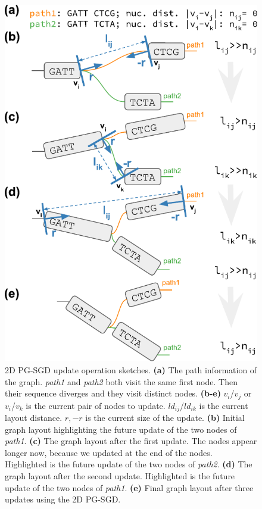 \begin{figure}[!htb]
	\centering
		\includegraphics[width=0.8\linewidth, trim=0cm 0cm 0cm 0cm, clip]{fig/sketches/FigureToHeaven.pdf}
	\caption{
		2D PG-SGD update operation sketches. \textbf{(a)} The path information of the graph. \textit{path1} and \textit{path2} both visit the same first node. Then their sequence diverges and they visit distinct nodes. \textbf{(b-e)} $v_i$/$v_j$ or $v_i$/$v_k$ is the current pair of nodes to update. $ld_{ij}$/$ld_{ik}$ is the current layout distance. $r,-r$ is the current size of the update. \textbf{(b)} Initial graph layout highlighting the future update of the two nodes of \textit{path1}. \textbf{(c)} The graph layout after the first update. The nodes appear longer now, because we updated at the end of the nodes. Highlighted is the future update of the two nodes of \textit{path2}. \textbf{(d)} The graph layout after the second update. Highlighted is the future update of the two nodes of \textit{path1}. \textbf{(e)} Final graph layout after three updates using the 2D PG-SGD.
	}
	\label{fig:sketches}
\end{figure}